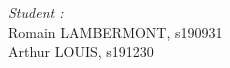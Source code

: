 \begin{titlepage}
\begin{minipage}{0.4\textwidth}
 		\begin{flushright} \large
 		\emph{Student :} \\
        Romain LAMBERMONT, s190931\\
        Arthur LOUIS, s191230\\
      
 	\end{flushright}

 \end{minipage}\\[2 cm]

 \thedate
\end{titlepage}

\thispagestyle{empty}
\tableofcontents
\listoffigures
\listoftables
\pagebreak
\setcounter{page}{1}